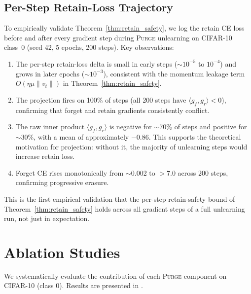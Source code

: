 \documentclass{article}
\newcommand{\ours}{\textsc{Purge}}
\newcommand{\newpar}[1]{{\color{orange}#1}}
\begin{document}
\newpar{
\subsection{Per-Step Retain-Loss Trajectory}\label{sec:perstep}

To empirically validate Theorem~\ref{thm:retain_safety}, we log the retain CE loss before and after every gradient step during \ours{} unlearning on CIFAR-10 class~0 (seed 42, 5 epochs, 200 steps). Key observations:
\begin{enumerate}[nosep,leftmargin=*]
\item The per-step retain-loss delta is small in early steps ($\sim 10^{-5}$ to $10^{-4}$) and grows in later epochs ($\sim 10^{-3}$), consistent with the momentum leakage term $O(\eta\mu\|v_t\|)$ in Theorem~\ref{thm:retain_safety}.
\item The projection fires on 100\% of steps (all 200 steps have $\langle g_f, g_r \rangle < 0$), confirming that forget and retain gradients consistently conflict.
\item The raw inner product $\langle g_f, g_r \rangle$ is negative for $\sim$70\% of steps and positive for $\sim$30\%, with a mean of approximately $-0.86$. This supports the theoretical motivation for projection: without it, the majority of unlearning steps would increase retain loss.
\item Forget CE rises monotonically from $\sim$0.002 to $>$7.0 across 200 steps, confirming progressive erasure.
\end{enumerate}

This is the first empirical validation that the per-step retain-safety bound of Theorem~\ref{thm:retain_safety} holds across all gradient steps of a full unlearning run, not just in expectation.
}


\section{Ablation Studies}\label{sec:ablation}

We systematically evaluate the contribution of each \ours{} component on CIFAR-10 (class 0).
Results are presented in .
\end{document}
